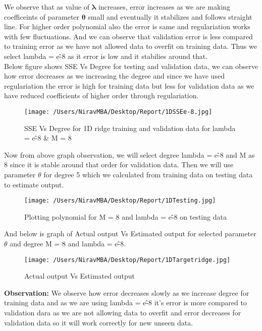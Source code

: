 \documentclass[12pt]{report}
\begin{document}
We observe that as value of $ \mathbf{\lambda} $ increases, error increases as we are making coefficeints of parameter $ \mathbf{\theta} $ small and eventually it stabilizes and follows straight line. For higher order polynomial also the error is same and regulariation works with few fluctuations. And we can observe that validation error is less compared to training error as we have not allowed data to overfit on training data. Thus we select lambda = e\^-8 as it error is low and it stabilies around that. \\

Below figure shows SSE Vs Degree for testing and validation data, we can observe  how error decreases as we increasing the degree and since we have used regulariation the error is high for training data but less for validation data as we have reduced coefficients of higher order through regulariation. \\

\begin{figure}[H]
	\centering
	\texttt{[image: /Users/NiravMBA/Desktop/Report/1DSSEe-8.jpg]}
	\caption{SSE Vs Degree for 1D ridge training and validation data for lambda = e\^-8  \& M = 8} 
\end{figure}




Now from above graph observation, we will select degree lambda = e\^-8  and M as 8 since it is stable around that order for validation data. Then we will use parameter $ {\theta } $ for degree 5 which we calculated from training data on testing data to estimate output.\\

\begin{figure}[H]
	\centering
	\texttt{[image: /Users/NiravMBA/Desktop/Report/1DTesting.jpg]}
	\caption{Plotting polynomial for M = 8 and lambda = e\^-8 on testing data} 
\end{figure}

\cleardoublepage
And below is graph of Actual output Vs Estimated output for selected parameter $ {\theta } $ and degree M = 8 and lambda = e\^-8.

\begin{figure}[H]
	
	\texttt{[image: /Users/NiravMBA/Desktop/Report/1DTargetridge.jpg]}
	\caption{Actual output Vs Estimated output} 
\end{figure}


{\bfseries Observation: } 
We observe how error decreases slowly as we increase degree for training data and as we are using lambda = e\^-8 it's error is more compared to validation dara as we are not allowing data to overfit and error decreases for validation data so it will work correctly for new unseen data.
\end{document}
